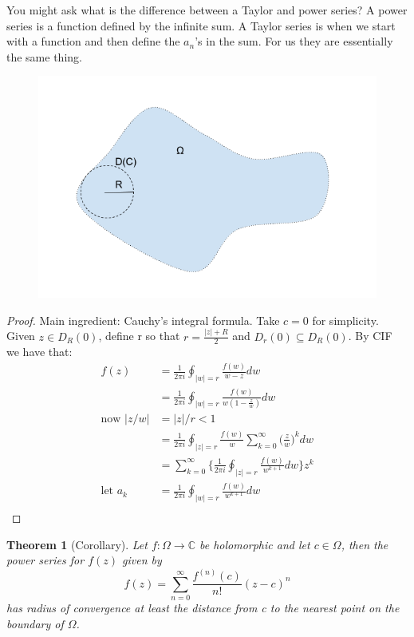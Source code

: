 \documentclass[a4paper, 11pt]{article}
\newtheorem*{theorem}{Theorem}
\begin{document}
	\noindent You might ask what is the difference between a Taylor and power series? A power series is a function defined by the infinite sum. A Taylor series is when we start with a function and then define the $a_n$'s in the sum. For us they are essentially the same thing. \\ 
	
	\begin{figure}[!hbt]
		\centering
		\includegraphics[scale=0.5]{powerSeriesDisc}
	\end{figure}
	
	
	\begin{proof}
		Main ingredient: Cauchy's integral formula. Take $c=0$ for simplicity. Given $z\in D_R(0)$, define r so that $r=\frac{|z|+R}{2}$ and $D_{r}(0)\subseteq D_R(0)$. By CIF we have that: 
			\begin{align*}
				f(z) &= \frac{1}{2\pi i}\oint_{|w|=r}\frac{f(w)}{w-z}dw\\ 
					&= \frac{1}{2\pi i}\oint_{|w|=r} \frac{f(w)}{w(1-\frac{z}{w})}dw\\
				\text{now } |z/w| &= |z|/r < 1 \\ 
					&= \frac{1}{2\pi i}\oint_{|z|=r}\frac{f(w)}{w}\sum\limits_{k=0}^\infty \Big(\frac{z}{w}\Big)^k dw \\ 
					&= \sum\limits_{k=0}^\infty  \Bigg\{ \frac{1}{2\pi i}\oint_{|z|=r} \frac{f(w)}{w^{k+1}} dw \Bigg\}z^k \\ 
				\text{let } a_k &= \frac{1}{2\pi i}\oint_{|w|=r}\frac{f(w)}{w^{k+1}}dw \\ 
			\end{align*}
	\end{proof}
	
	\begin{theorem}[Corollary]
		Let $f:\Omega\rightarrow \mathbb{C}$ be holomorphic and let $c\in\Omega$, then the power series for $f(z)$ given by 	
			\begin{equation*}
				f(z) = \sum\limits_{n=0}^\infty \frac{f^{(n)}(c)}{n!}(z-c)^n
			\end{equation*}
		has radius of convergence at least the distance from c to the nearest point on the boundary of $\Omega$. 
	\end{theorem}
	
	
	
	
	
	
	
	
	
	
	
	
	
	
	
	
	
	
\end{document}
